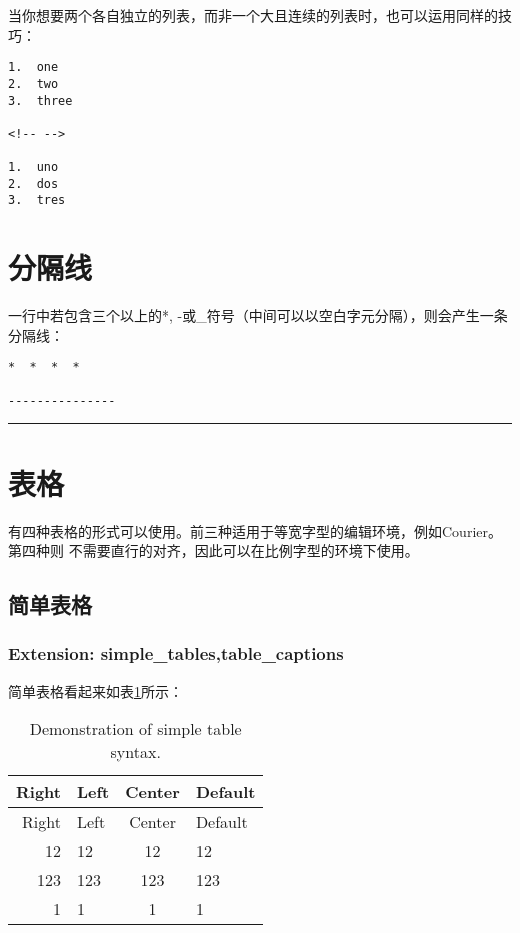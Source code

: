 \documentclass[cn]{elegantbook}
\begin{document}
当你想要两个各自独立的列表，而非一个大且连续的列表时，也可以运用同样的技巧：

\begin{lstlisting}
1.  one
2.  two
3.  three

<!-- -->

1.  uno
2.  dos
3.  tres
\end{lstlisting}

\hypertarget{ux5206ux9694ux7ebf}{%
\section{分隔线}\label{ux5206ux9694ux7ebf}}

一行中若包含三个以上的*,
-或\_符号（中间可以以空白字元分隔），则会产生一条分隔线：

\begin{lstlisting}
*  *  *  *

---------------
\end{lstlisting}

\begin{center}\rule{0.5\linewidth}{\linethickness}\end{center}

\hypertarget{ux8868ux683c}{%
\section{表格}\label{ux8868ux683c}}

有四种表格的形式可以使用。前三种适用于等宽字型的编辑环境，例如Courier。第四种则
不需要直行的对齐，因此可以在比例字型的环境下使用。

\hypertarget{ux7b80ux5355ux8868ux683c}{%
\subsection{简单表格}\label{ux7b80ux5355ux8868ux683c}}

\hypertarget{extension-simple_tablestable_captions}{%
\subsubsection{Extension:
simple\_tables,table\_captions}\label{extension-simple_tablestable_captions}}

简单表格看起来如表\ref{table:simpletable}所示：

\begin{longtable}[]{@{}rlcl@{}}
\caption{Demonstration of simple table
syntax.\label{table:simpletable}}\tabularnewline
\toprule
Right & Left & Center & Default\tabularnewline
\midrule
\endfirsthead
\toprule
Right & Left & Center & Default\tabularnewline
\midrule
\endhead
12 & 12 & 12 & 12\tabularnewline
123 & 123 & 123 & 123\tabularnewline
1 & 1 & 1 & 1\tabularnewline
\bottomrule
\end{longtable}
\end{document}
